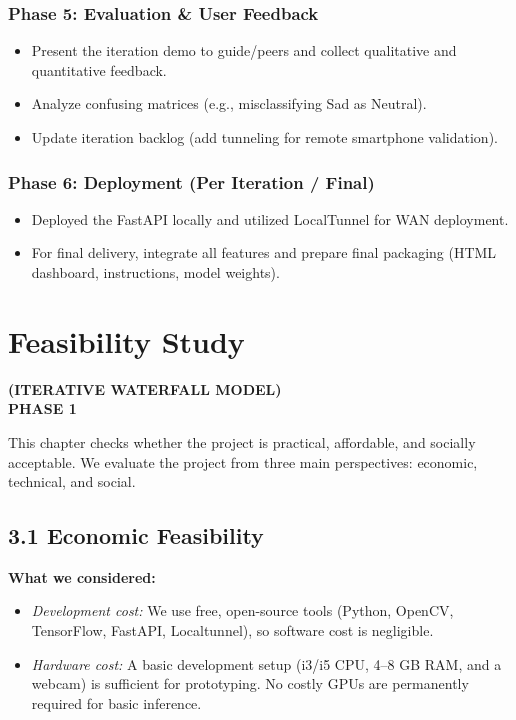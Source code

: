 \documentclass[12pt,a4paper]{report}
\begin{document}
\subsection*{Phase 5: Evaluation \& User Feedback}
\begin{itemize}
    \item Present the iteration demo to guide/peers and collect qualitative and quantitative feedback.
    \item Analyze confusing matrices (e.g., misclassifying Sad as Neutral).
    \item Update iteration backlog (add tunneling for remote smartphone validation).
\end{itemize}

\subsection*{Phase 6: Deployment (Per Iteration / Final)}
\begin{itemize}
    \item Deployed the FastAPI locally and utilized LocalTunnel for WAN deployment.
    \item For final delivery, integrate all features and prepare final packaging (HTML dashboard, instructions, model weights).
\end{itemize}

\clearpage


\chapter{Feasibility Study}
\begin{center}
\textbf{(ITERATIVE WATERFALL MODEL)}\\[6pt]
\textbf{PHASE 1}\\[6pt]
\end{center}

This chapter checks whether the project is practical, affordable, and socially acceptable. We evaluate the project from three main perspectives: economic, technical, and social.

\section*{3.1 Economic Feasibility}

\textbf{What we considered:}
\begin{itemize}
    \item \textit{Development cost:} We use free, open-source tools (Python, OpenCV, TensorFlow, FastAPI, Localtunnel), so software cost is negligible.
    \item \textit{Hardware cost:} A basic development setup (i3/i5 CPU, 4–8 GB RAM, and a webcam) is sufficient for prototyping. No costly GPUs are permanently required for basic inference.
\end{itemize}
\end{document}
